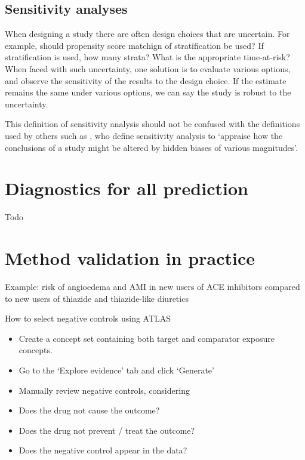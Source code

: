 \documentclass[]{book}
\providecommand{\tightlist}{%
  \setlength{\itemsep}{0pt}\setlength{\parskip}{0pt}}
\begin{document}
\subsection{Sensitivity analyses}\label{sensitivity-analyses}

When designing a study there are often design choices that are
uncertain. For example, should propensity score matchign of
stratification be used? If stratification is used, how many strata? What
is the appropriate time-at-risk? When faced with such uncertainty, one
solution is to evaluate various options, and observe the sensitivity of
the results to the design choice. If the estimate remains the same under
various options, we can say the study is robust to the uncertainty.

This definition of sensitivity analysis should not be confused with the
definitions used by others such as \citet{rosenbaum_2005}, who define
sensitivity analysis to `appraise how the conclusions of a study might
be altered by hidden biases of various magnitudes'.

\section{Diagnostics for all
prediction}\label{diagnostics-for-all-prediction}

Todo

\section{Method validation in
practice}\label{method-validation-in-practice}

Example: risk of angioedema and AMI in new users of ACE inhibitors
compared to new users of thiazide and thiazide-like diuretics

How to select negative controls using ATLAS

\begin{itemize}
\tightlist
\item
  Create a concept set containing both target and comparator exposure
  concepts.
\item
  Go to the `Explore evidence' tab and click `Generate'
\item
  Manually review negative controls, considering
\item
  Does the drug not cause the outcome?
\item
  Does the drug not prevent / treat the outcome?
\item
  Does the negative control appear in the data?
\end{itemize}
\end{document}
